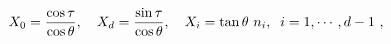 \begin{equation}
X_0= {\cos \tau\over \cos \theta},\quad  X_d = 
  {\sin\tau  \over \cos\theta}, \quad X_i = \tan\theta\,\, n_i ,\;\; 
  i=1,\cdots , d-1\ ,
\label{adstwo}
\end{equation}


